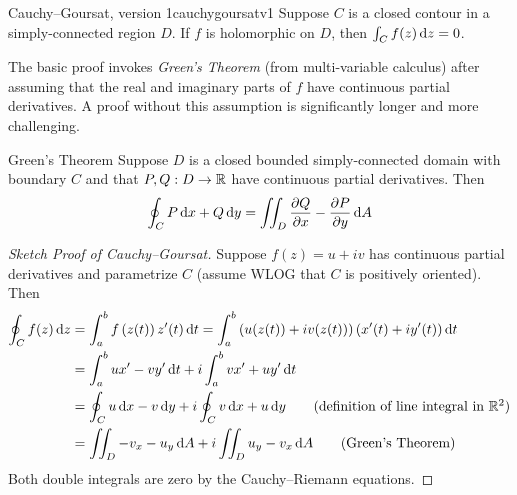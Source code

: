 \begin{thm}{Cauchy--Goursat, version 1}{cauchygoursatv1}
	Suppose $C$ is a closed contour in a simply-connected region $D$. If $f$ is holomorphic on $D$, then $\int_Cf(z)\,\dz=0$.
\end{thm}

The basic proof invokes \emph{Green's Theorem} (from multi-variable calculus) after assuming that the real and imaginary parts of $f$ have continuous partial derivatives. A proof without this assumption is significantly longer and more challenging.

\begin{lemm}{Green's Theorem}{}
	Suppose $D$ is a closed bounded simply-connected domain with boundary $C$ and that $P,Q:D\to\R$ have continuous partial derivatives. Then
	\[
		\oint_CP\,\dx+Q\,\dy=\iint_D\partials[Q]{x}-\partials[P]{y}\,\dA
	\] 
\end{lemm}

\begin{proof}[Sketch Proof of Cauchy--Goursat]
	Suppose $f(z)=u+iv$ has continuous partial derivatives and parametrize $C$ (assume WLOG that $C$ is positively oriented). Then
	\begin{align*}
		\oint_Cf(z)\,\dz&=\int_a^bf\left(z(t)\right)z'(t)\,\dt =\int_a^b\left(u(z(t))+iv(z(t))\right)\left(x'(t)+iy'(t)\right)\dt\\
		&=\int_a^bux'-vy'\,\dt+i\int_a^bvx'+uy'\,\dt\\
		&=\oint_Cu\,\dx-v\,\dy+i\oint_Cv\,\dx+u\,\dy \tag{definition of line integral in $\R^2$}\\
		&=\iint_D-v_x-u_y\,\dA+i\iint_Du_y-v_x\,\dA \tag{Green's Theorem}
	\end{align*}
	Both double integrals are zero by the Cauchy--Riemann equations. 
\end{proof}

